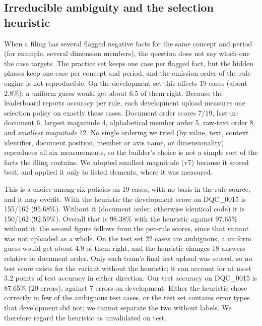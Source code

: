 \documentclass[conference]{IEEEtran}
\begin{document}
\subsection{Irreducible ambiguity and the selection heuristic}\label{sec:t3-ambiguity}
When a filing has several flagged negative facts for the same concept and period (for example, several dimension
members), the question does not say which one the case targets. The practice set keeps one case per flagged fact, but
the hidden phases keep one case per concept and period, and the emission order of the rule engine is not
reproducible. On the development set this affects 19 cases (about 2.8\%); a uniform guess would get about 6.5 of
them right. Because the leaderboard reports accuracy per rule, each development upload measures one selection policy on
exactly these cases. Document order scores 7/19, last-in-document 6, largest magnitude 4, alphabetical member order
5, raw-text order 8, and \emph{smallest magnitude} 12. No single ordering we tried (by value, text, context
identifier, document position, member or
axis name, or dimensionality) reproduces all six measurements, so the builder's choice is not a simple sort of the
facts the
filing contains. We adopted smallest magnitude (v7) because it scored best, and applied it only to listed elements,
where it was measured.

This is a choice among six policies on 19 cases, with no basis in the rule source, and it may overfit. With the
heuristic the development score on DQC\_0015 is 155/162 (95.68\%). Without it (document order, otherwise identical
code) it is 150/162 (92.59\%). Overall that is 98.38\% with the heuristic against 97.65\% without it; the second
figure follows from the per-rule scores, since that variant was not uploaded as a whole. On the test set
22 cases are ambiguous, a uniform guess would get about 4.9 of them right, and the heuristic changes 18 answers
relative to document order. Only each team's final test upload was scored, so no test score exists for the variant
without the heuristic; it can account for at most 3.2 points of test accuracy in either direction. Our test accuracy
on DQC\_0015 is 87.65\% (20 errors), against 7 errors on development. Either the
heuristic chose correctly in few of the ambiguous test cases, or the test set contains error types that
development did not; we cannot separate the two without labels. We therefore regard the heuristic as unvalidated
on test.
\end{document}
